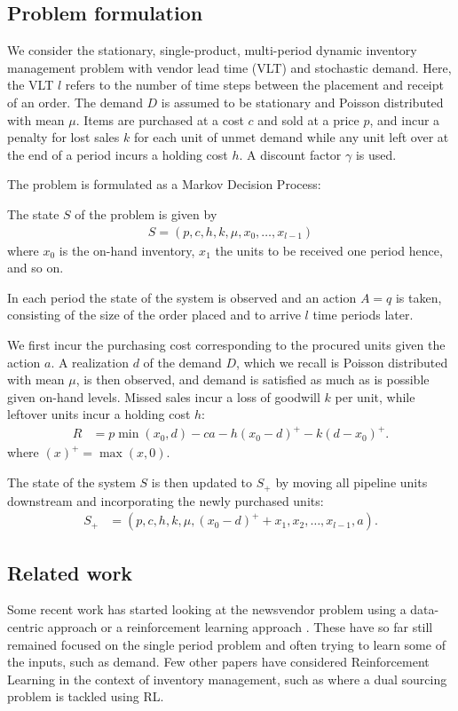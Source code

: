 \subsection{Problem formulation}
We consider the stationary, single-product, multi-period dynamic inventory management problem with vendor lead time (VLT) and stochastic demand. Here, the VLT $l$  refers to the number of time steps between the placement  and receipt of an order. The demand $D$ is assumed to be stationary and Poisson distributed with mean $\mu$. Items are purchased at a cost $c$ and sold at a price $p$, and incur a penalty for lost sales $k$ for each unit of unmet demand while any unit left over at the end of a period incurs a holding cost $h$. A discount factor $\gamma$ is used.


The problem is formulated as a Markov Decision Process: 
\begin{description}[style=unboxed,leftmargin=0cm]
\item[State:] The state $S$ of the problem is given by
\begin{align*}
S=(p,c,h,k,\mu,x_0,\ldots,x_{l-1})
\end{align*}
where $x_0$ is the on-hand inventory, $x_1$ the units to be received one period hence, and so on.
\item[Action:] In each period the state of the system is observed and an action $A=q$ is taken, consisting of the size of the order placed and to arrive $l$ time periods later.
\item[Reward:] We first incur the purchasing cost corresponding to the procured units given the action $a$.
A realization $d$ of the demand $D$, which we recall is Poisson distributed with mean $\mu$, is then observed, and demand is satisfied as much as is possible given on-hand levels. Missed sales incur a loss of goodwill $k$ per unit, while leftover units incur a holding cost $h$:
\begin{align*}
R &= p\min(x_0,d) - c a - h (x_0 - d)^+ - k (d - x_0)^+.
\end{align*}
where $(x)^+=\max(x,0)$.
\item[Transition:] The state of the system $S$ is then updated to $S_+$ by moving all pipeline units downstream and incorporating the newly purchased units:
\begin{align*}
S_+ &= (p,c,h,k,\mu,(x_0 - d)^+ +x_1,x_2,\ldots,x_{l-1},a).
\end{align*}
\end{description}

\subsection{Related work}
Some recent work has started looking at the newsvendor problem using a data-centric approach \cite{rudin2014big} or a reinforcement learning approach \cite{oroojlooyjadid2016applying}. These have so far still remained focused on the single period problem and often trying to learn some of the inputs, such as demand. Few other papers have considered Reinforcement Learning in the context of inventory management, such as \cite{gijsbrechts2018can} where a dual sourcing problem is tackled using RL.

